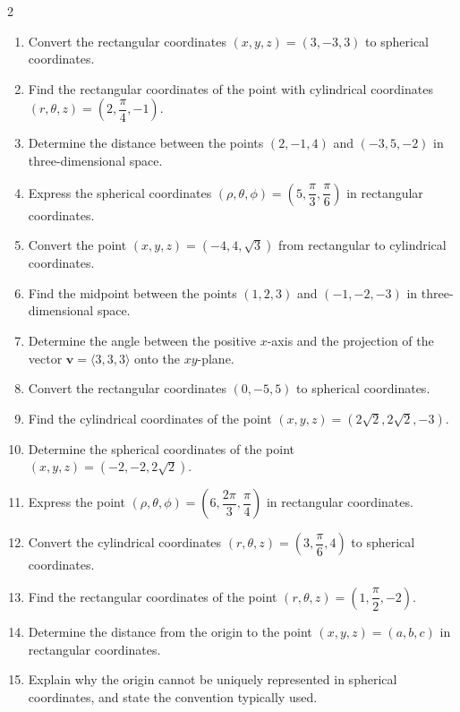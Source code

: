 \begin{multicols}{2}
\begin{enumerate}
    \item Convert the rectangular coordinates \( (x, y, z) = (3, -3, 3) \) to spherical coordinates.
    \item Find the rectangular coordinates of the point with cylindrical coordinates \( (r, \theta, z) = \left(2, \dfrac{\pi}{4}, -1\right) \).
    \item Determine the distance between the points \( (2, -1, 4) \) and \( (-3, 5, -2) \) in three-dimensional space.
    \item Express the spherical coordinates \( (\rho, \theta, \phi) = \left(5, \dfrac{\pi}{3}, \dfrac{\pi}{6}\right) \) in rectangular coordinates.
    \item Convert the point \( (x, y, z) = (-4, 4, \sqrt{3}) \) from rectangular to cylindrical coordinates.
    \item Find the midpoint between the points \( (1, 2, 3) \) and \( (-1, -2, -3) \) in three-dimensional space.
    \item Determine the angle between the positive \( x \)-axis and the projection of the vector \( \mathbf{v} = \langle 3, 3, 3 \rangle \) onto the \( xy \)-plane.
    \item Convert the rectangular coordinates \( (0, -5, 5) \) to spherical coordinates.
    \item Find the cylindrical coordinates of the point \( (x, y, z) = (2\sqrt{2}, 2\sqrt{2}, -3) \).
    \item Determine the spherical coordinates of the point \( (x, y, z) = (-2, -2, 2\sqrt{2}) \).
    \item Express the point \( (\rho, \theta, \phi) = \left(6, \dfrac{2\pi}{3}, \dfrac{\pi}{4}\right) \) in rectangular coordinates.
    \item Convert the cylindrical coordinates \( (r, \theta, z) = \left(3, \dfrac{\pi}{6}, 4\right) \) to spherical coordinates.
    \item Find the rectangular coordinates of the point \( (r, \theta, z) = \left(1, \dfrac{\pi}{2}, -2\right) \).
    \item Determine the distance from the origin to the point \( (x, y, z) = (a, b, c) \) in rectangular coordinates.
    \item Explain why the origin cannot be uniquely represented in spherical coordinates, and state the convention typically used.


\end{enumerate}
\end{multicols}
